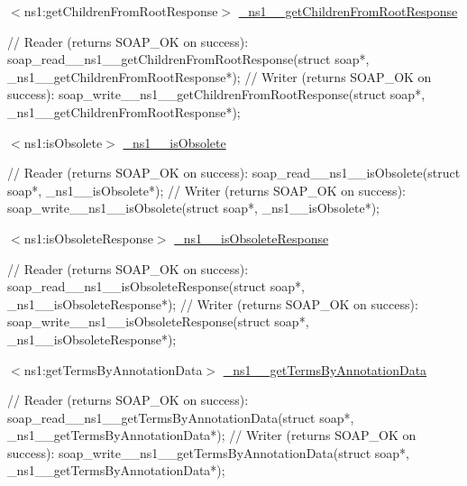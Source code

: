 \begin{DoxyItemize}
\item $<$ns1:getChildrenFromRootResponse$>$ \hyperlink{class__ns1____getChildrenFromRootResponse}{\_\-ns1\_\-\_\-getChildrenFromRootResponse} 
\begin{DoxyCode}
    // Reader (returns SOAP_OK on success):
    soap_read__ns1__getChildrenFromRootResponse(struct soap*, 
      _ns1__getChildrenFromRootResponse*);
    // Writer (returns SOAP_OK on success):
    soap_write__ns1__getChildrenFromRootResponse(struct soap*, 
      _ns1__getChildrenFromRootResponse*);
\end{DoxyCode}

\end{DoxyItemize}


\begin{DoxyItemize}
\item $<$ns1:isObsolete$>$ \hyperlink{class__ns1____isObsolete}{\_\-ns1\_\-\_\-isObsolete} 
\begin{DoxyCode}
    // Reader (returns SOAP_OK on success):
    soap_read__ns1__isObsolete(struct soap*, _ns1__isObsolete*);
    // Writer (returns SOAP_OK on success):
    soap_write__ns1__isObsolete(struct soap*, _ns1__isObsolete*);
\end{DoxyCode}

\end{DoxyItemize}


\begin{DoxyItemize}
\item $<$ns1:isObsoleteResponse$>$ \hyperlink{class__ns1____isObsoleteResponse}{\_\-ns1\_\-\_\-isObsoleteResponse} 
\begin{DoxyCode}
    // Reader (returns SOAP_OK on success):
    soap_read__ns1__isObsoleteResponse(struct soap*, _ns1__isObsoleteResponse*);
    // Writer (returns SOAP_OK on success):
    soap_write__ns1__isObsoleteResponse(struct soap*, _ns1__isObsoleteResponse*);
      
\end{DoxyCode}

\end{DoxyItemize}


\begin{DoxyItemize}
\item $<$ns1:getTermsByAnnotationData$>$ \hyperlink{class__ns1____getTermsByAnnotationData}{\_\-ns1\_\-\_\-getTermsByAnnotationData} 
\begin{DoxyCode}
    // Reader (returns SOAP_OK on success):
    soap_read__ns1__getTermsByAnnotationData(struct soap*, 
      _ns1__getTermsByAnnotationData*);
    // Writer (returns SOAP_OK on success):
    soap_write__ns1__getTermsByAnnotationData(struct soap*, 
      _ns1__getTermsByAnnotationData*);
\end{DoxyCode}

\end{DoxyItemize}


